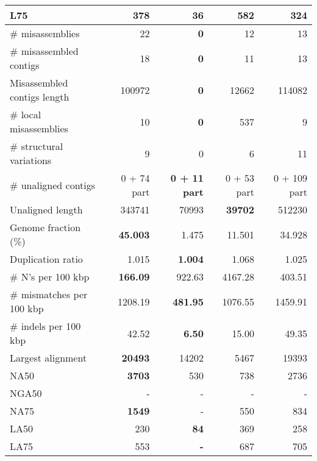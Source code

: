 \documentclass[12pt,a4paper]{article}
\begin{document}
\begin{table}[ht]
\begin{center}
\begin{tabular}{|l*{4}{|r}|}
L75 & 378 & {\bf 36} & 582 & 324 \\ \hline
\# misassemblies & 22 & {\bf 0} & 12 & 13 \\ \hline
\# misassembled contigs & 18 & {\bf 0} & 11 & 13 \\ \hline
Misassembled contigs length & 100972 & {\bf 0} & 12662 & 114082 \\ \hline
\# local misassemblies & 10 & {\bf 0} & 537 & 9 \\ \hline
\# structural variations & 9 & 0 & 6 & 11 \\ \hline
\# unaligned contigs & 0 + 74 part & {\bf 0 + 11 part} & 0 + 53 part & 0 + 109 part \\ \hline
Unaligned length & 343741 & 70993 & {\bf 39702} & 512230 \\ \hline
Genome fraction (\%) & {\bf 45.003} & 1.475 & 11.501 & 34.928 \\ \hline
Duplication ratio & 1.015 & {\bf 1.004} & 1.068 & 1.025 \\ \hline
\# N's per 100 kbp & {\bf 166.09} & 922.63 & 4167.28 & 403.51 \\ \hline
\# mismatches per 100 kbp & 1208.19 & {\bf 481.95} & 1076.55 & 1459.91 \\ \hline
\# indels per 100 kbp & 42.52 & {\bf 6.50} & 15.00 & 49.35 \\ \hline
Largest alignment & {\bf 20493} & 14202 & 5467 & 19393 \\ \hline
NA50 & {\bf 3703} & 530 & 738 & 2736 \\ \hline
NGA50 & - & - & - & - \\ \hline
NA75 & {\bf 1549} & - & 550 & 834 \\ \hline
LA50 & 230 & {\bf 84} & 369 & 258 \\ \hline
LA75 & 553 & {\bf -} & 687 & 705 \\ \hline
\end{tabular}
\end{center}
\end{table}
\end{document}
